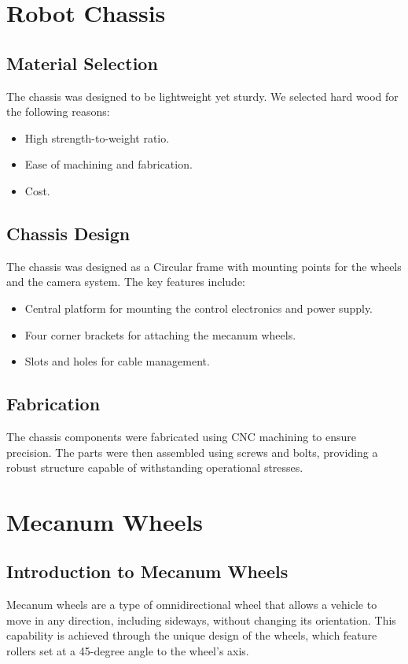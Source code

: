 \section{Robot Chassis}
\subsection{Material Selection}
The chassis was designed to be lightweight yet sturdy. We selected hard wood for the following
reasons:
\begin{itemize}
	\item High strength-to-weight ratio.
	\item Ease of machining and fabrication.
	\item Cost.
\end{itemize}


\subsection{Chassis Design}
The chassis was designed as a Circular frame with mounting points for the wheels and the camera
system. The key features include:
\begin{itemize}
	\item Central platform for mounting the control electronics and power supply.
	\item Four corner brackets for attaching the mecanum wheels.
	\item Slots and holes for cable management.
\end{itemize}


\subsection{Fabrication}
The chassis components were fabricated using CNC machining to ensure precision. The parts were
then assembled using screws and bolts, providing a robust structure capable of withstanding
operational stresses.

\section{Mecanum Wheels}

\subsection{Introduction to Mecanum Wheels}
Mecanum wheels are a type of omnidirectional wheel that allows a vehicle to move in any direction,
including sideways, without changing its orientation. This capability is achieved through the unique
design of the wheels, which feature rollers set at a 45-degree angle to the wheel’s axis.
